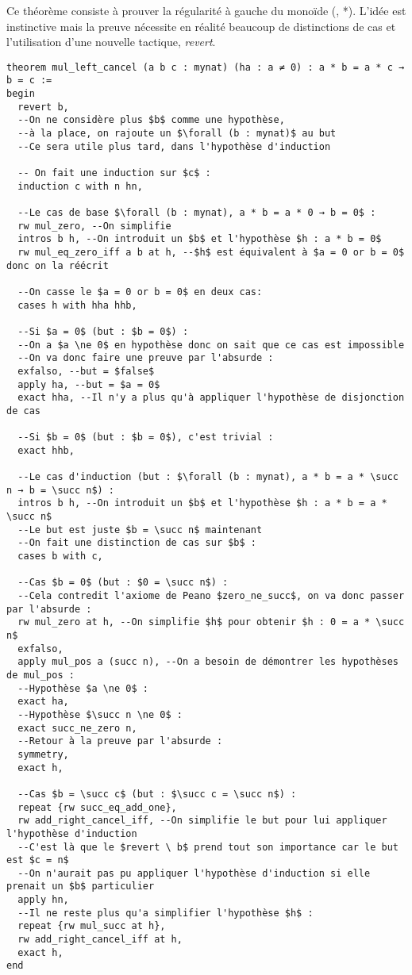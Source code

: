 Ce théorème consiste à prouver la régularité à gauche du monoïde (\mynat, *).
L'idée est instinctive mais la preuve nécessite en réalité beaucoup de distinctions de cas et l'utilisation d'une nouvelle tactique, \textit{revert}.
\begin{verbatim}
theorem mul_left_cancel (a b c : mynat) (ha : a ≠ 0) : a * b = a * c → b = c :=
begin
  revert b,
  --On ne considère plus $b$ comme une hypothèse,
  --à la place, on rajoute un $\forall (b : mynat)$ au but
  --Ce sera utile plus tard, dans l'hypothèse d'induction
  
  -- On fait une induction sur $c$ :
  induction c with n hn,

  --Le cas de base $\forall (b : mynat), a * b = a * 0 → b = 0$ :
  rw mul_zero, --On simplifie
  intros b h, --On introduit un $b$ et l'hypothèse $h : a * b = 0$
  rw mul_eq_zero_iff a b at h, --$h$ est équivalent à $a = 0 or b = 0$ donc on la réécrit
  
  --On casse le $a = 0 or b = 0$ en deux cas:
  cases h with hha hhb,
  
  --Si $a = 0$ (but : $b = 0$) :
  --On a $a \ne 0$ en hypothèse donc on sait que ce cas est impossible
  --On va donc faire une preuve par l'absurde :
  exfalso, --but = $false$
  apply ha, --but = $a = 0$
  exact hha, --Il n'y a plus qu'à appliquer l'hypothèse de disjonction de cas
  
  --Si $b = 0$ (but : $b = 0$), c'est trivial :
  exact hhb,

  --Le cas d'induction (but : $\forall (b : mynat), a * b = a * \succ n → b = \succ n$) :
  intros b h, --On introduit un $b$ et l'hypothèse $h : a * b = a * \succ n$
  --Le but est juste $b = \succ n$ maintenant
  --On fait une distinction de cas sur $b$ :
  cases b with c,

  --Cas $b = 0$ (but : $0 = \succ n$) :
  --Cela contredit l'axiome de Peano $zero_ne_succ$, on va donc passer par l'absurde :
  rw mul_zero at h, --On simplifie $h$ pour obtenir $h : 0 = a * \succ n$
  exfalso,
  apply mul_pos a (succ n), --On a besoin de démontrer les hypothèses de mul_pos :
  --Hypothèse $a \ne 0$ :
  exact ha,
  --Hypothèse $\succ n \ne 0$ :
  exact succ_ne_zero n,
  --Retour à la preuve par l'absurde :
  symmetry,
  exact h,

  --Cas $b = \succ c$ (but : $\succ c = \succ n$) :
  repeat {rw succ_eq_add_one},
  rw add_right_cancel_iff, --On simplifie le but pour lui appliquer l'hypothèse d'induction
  --C'est là que le $revert \ b$ prend tout son importance car le but est $c = n$
  --On n'aurait pas pu appliquer l'hypothèse d'induction si elle prenait un $b$ particulier
  apply hn,
  --Il ne reste plus qu'a simplifier l'hypothèse $h$ :
  repeat {rw mul_succ at h},
  rw add_right_cancel_iff at h,
  exact h,
end
\end{verbatim}

